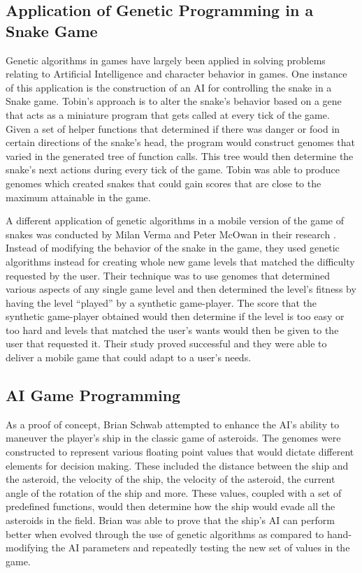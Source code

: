 \subsection{Application of Genetic Programming in a Snake Game}
Genetic algorithms in games have largely been applied in solving problems relating to
Artificial Intelligence and character behavior in games. One instance of this application
is the construction of an AI for controlling the snake in a Snake game\cite{Ehlis00}.
Tobin's approach is to alter the snake's behavior based on a gene that acts as a miniature
program that gets called at every tick of the game. Given a set of helper functions that
determined if there was danger or food in certain directions of the snake's head, the
program would construct genomes that varied in the generated tree of function calls. This
tree would then determine the snake's next actions during every tick of the game. Tobin
was able to produce genomes which created snakes that could gain scores that are close to
the maximum attainable in the game.  


A different application of genetic algorithms in a mobile version of the game of snakes
was conducted by Milan Verma and Peter McOwan in their research \cite{Verma05}. Instead
of modifying the behavior of the snake in the game, they used genetic algorithms instead
for creating whole new game levels that matched the difficulty requested by the user.
Their technique was to use genomes that determined various aspects of any single game
level and then determined the level's fitness by having the level “played” by a synthetic
game-player. The score that the synthetic game-player obtained would then determine if
the level is too easy or too hard and levels that matched the user's wants would then be
given to the user that requested it. Their study proved successful and they were able to
deliver a mobile game that could adapt to a user's needs.

\subsection{AI Game Programming}
As a proof of concept, Brian Schwab attempted to enhance the AI's ability to maneuver
the player's ship in the classic game of asteroids\cite{Schwab04}. The genomes were constructed to represent
various floating point values that would dictate different elements for decision making.
These included the distance between the ship and the asteroid, the velocity of the ship, the
velocity of the asteroid, the current angle of the rotation of the ship and more. These
values, coupled with a set of predefined functions, would then determine how the ship would
evade all the asteroids in the field. Brian was able to prove that the ship's AI can perform
better when evolved through the use of genetic algorithms as compared to hand-modifying the
AI parameters and repeatedly testing the new set of values in the game.
